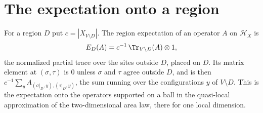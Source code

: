 \section{The expectation onto a region}
\label{sec:sites_region_expectation}

\begin{definition}
    \label{def:sites_region_expectation}
    \leanok
    For a region $D$ put $c=|X_{V\setminus D}|$. The region expectation of an
    operator $A$ on $\mathcal H_X$ is
    \begin{align}
        E_D(A)=c^{-1}\,\Tr_{V\setminus D}(A)\otimes1,
        \label{eq:sites_region_expectation}
    \end{align}
    the normalized partial trace over the sites outside $D$, placed on $D$. Its
    matrix element at $(\sigma,\tau)$ is $0$ unless $\sigma$ and $\tau$ agree
    outside $D$, and is then $c^{-1}\sum_{y}A_{(\sigma|_D,y),(\tau|_D,y)}$, the
    sum running over the configurations $y$ of $V\setminus D$. This is the expectation onto the operators supported on a
    ball in the quasi-local approximation of the two-dimensional area law, there
    for one local dimension.
\end{definition}

